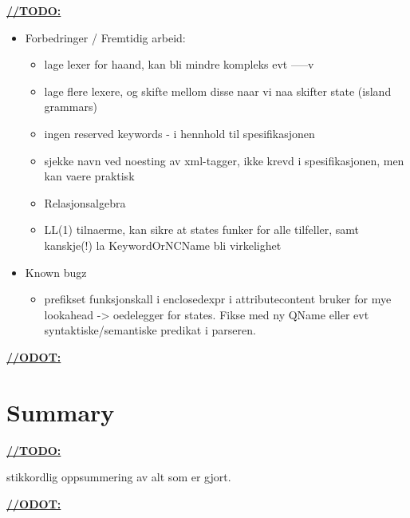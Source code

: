 \label{sect:summary:future_work}
\underline{\textbf{\LARGE //TODO:}}
\begin{itemize}
	\item Forbedringer / Fremtidig arbeid:
	\begin{itemize}
		\item lage lexer for haand, kan bli mindre kompleks evt -----v
		\item lage flere lexere, og skifte mellom disse naar vi naa skifter state (island grammars)
		\item ingen reserved keywords - i hennhold til spesifikasjonen
		\item sjekke navn ved noesting av xml-tagger, ikke krevd i spesifikasjonen, men kan vaere praktisk
		\item Relasjonsalgebra
		\item LL(1) tilnaerme, kan sikre at states funker for alle tilfeller, samt kanskje(!) la KeywordOrNCName bli virkelighet
	\end{itemize}

	\item Known bugz
	\begin{itemize}
		\item prefikset funksjonskall i enclosedexpr i attributecontent bruker for mye lookahead -> oedelegger for states. Fikse med ny QName eller evt syntaktiske/semantiske predikat i parseren.
	\end{itemize}
	
\end{itemize}

\underline{\textbf{\LARGE //ODOT:}}

\section{Summary}

\underline{\textbf{\LARGE //TODO:}}

stikkordlig oppsummering av alt som er gjort.

\underline{\textbf{\LARGE //ODOT:}}
